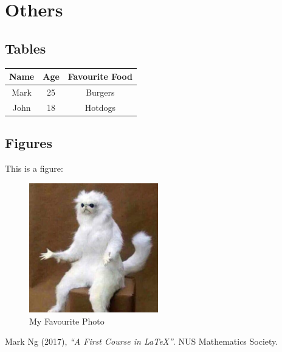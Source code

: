 \documentclass{article}
\begin{document}
	\newpage
	\section{Others}
		\subsection{Tables}
			\begin{center}
				\begin{tabular}{| c | c | c |}
					\hline
					Name & Age & Favourite Food\\
					\hline
					Mark & 25 & Burgers \\
					John & 18 & Hotdogs \\
					\hline
				\end{tabular}	
			\end{center}
		\subsection{Figures}
			This is a figure:
			\begin{figure}[H]
				\centering
				\includegraphics[width=0.5\textwidth]{meme.jpg}
				\caption{My Favourite Photo}
			\end{figure}
	\begin{thebibliography}{100}
		 Mark Ng (2017), \emph{``A First Course in \LaTeX{}''}. NUS Mathematics Society.
	\end{thebibliography}
\end{document}
